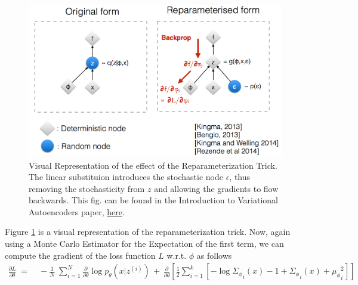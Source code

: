 \documentclass[12pt]{report}
\begin{document}
\begin{figure}
    \includegraphics[scale=0.35]{reptr.png}   
    \caption{Visual Representation of the effect of the Reparameterization Trick.
             The linear substituion introduces the stochastic node $\epsilon$, thus
             removing the stochasticity from $z$ and allowing the gradients to flow
             backwards. This fig. can be found in the Introduction to Variational
             Autoencoders paper, \href{https://arxiv.org/abs/1906.02691}{here}.}
    \label{fig:RepTrick}
\end{figure}
\bigskip

Figure \ref{fig:RepTrick} is a visual representation of the reparameterization trick.
Now, again using a Monte Carlo Estimator for the Expectation of the first term,
we can compute the gradient of the loss function $L$ w.r.t. $\phi$ as follows
\begin{align*}
    \frac{\partial L}{\partial \theta}
    \;=&\; -\frac{1}{N} \;\sum_{i=1}^N \frac{\partial}{\partial \theta}
                \log p_{\theta}(x | z^{(i)}) \,+\,
            \frac{\partial}{\partial \theta} \left[
                \frac{1}{2} \sum_{i=1}^k \left[ - \log {\Sigma_{\phi}}_i(x)
                - 1
                + {\Sigma_{\phi}}_i(x)
                + {\mu_{\phi}}_i^2 \right]
            \right]
\end{align*}
\clearpage

\end{document}
